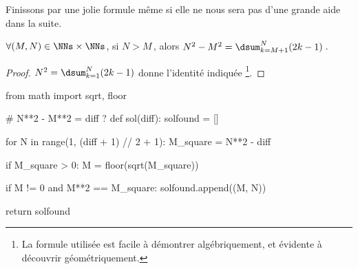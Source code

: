 	


Finissons par une jolie formule même si elle ne nous sera pas d'une grande aide dans la suite.


\begin{fact} \label{dist-square}
	$\forall (M, N) \in \NNs \times \NNs$, 
	si $N > M$\,, alors $N^2 - M^2 = \dsum_{k=M+1}^{N} (2 k - 1)$\,.
\end{fact}


\begin{proof}
	$N^2 = \dsum_{k=1}^{N} (2 k - 1)$ donne l'identité indiquée
	\footnote{
		La formule utilisée est facile à démontrer algébriquement, et évidente à découvrir géométriquement.
	}.
\end{proof}

	


\newpage
\bgroup
\small
\begin{Python}
from math import sqrt, floor

# N**2 - M**2 = diff ?
def sol(diff):
    solfound = []

    for N in range(1, (diff + 1) // 2 + 1):
        M_square = N**2 - diff

        if M_square > 0:
            M = floor(sqrt(M_square))

            if M != 0 and M**2 == M_square:
                solfound.append((M, N))

    return solfound
\end{Python}
\egroup